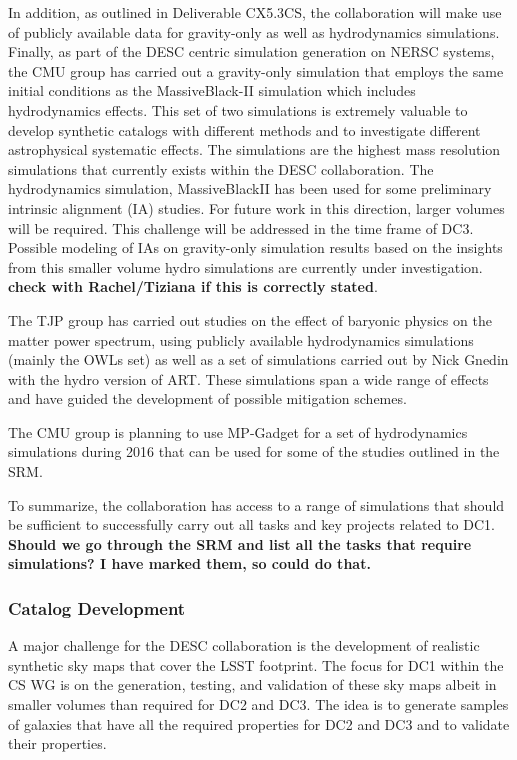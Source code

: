 In addition, as outlined in Deliverable CX5.3CS, the collaboration will make use of publicly available data for gravity-only as well as hydrodynamics simulations. Finally, as part of the DESC centric simulation generation on NERSC systems, the CMU group has carried out a gravity-only simulation that employs the same initial conditions as the MassiveBlack-II simulation which includes hydrodynamics effects. This set of two simulations is extremely valuable to develop synthetic catalogs with different methods and to investigate different astrophysical systematic effects. The simulations are the highest mass resolution simulations that currently exists within the DESC collaboration. The hydrodynamics simulation, MassiveBlackII has been used for some preliminary intrinsic alignment (IA) studies. For future work in this direction, larger volumes will be required. This challenge will be addressed in the time frame of DC3. Possible modeling of IAs on gravity-only simulation results based on the insights from this smaller volume hydro simulations are currently under investigation. {\bf check with Rachel/Tiziana if this is correctly stated}.

The TJP group has carried out studies on the effect of baryonic physics on the matter power spectrum, using publicly available hydrodynamics simulations (mainly the OWLs set) as well as a set of simulations carried out by Nick Gnedin with the hydro version of ART. These simulations span a wide range of effects and have guided the development of possible mitigation schemes.

The CMU group is planning to use MP-Gadget for a set of hydrodynamics simulations during 2016 that can be used for some of the studies outlined in the SRM.

To summarize, the collaboration has access to a range of simulations that should be sufficient to successfully carry out all tasks and key projects related to DC1. {\bf Should we go through the SRM and list all the tasks that require simulations? I have marked them, so could do that.}

\subsubsection{Catalog Development}
\label{sec:keysims:dc1:dev}

A major challenge for the DESC collaboration is the development of realistic synthetic sky maps that cover the LSST footprint. The focus for DC1 within the CS WG is on the generation, testing, and validation of these sky maps albeit in smaller volumes than required for DC2 and DC3. The idea is to generate samples of galaxies that have all the required properties for DC2 and DC3 and to validate their properties. 

